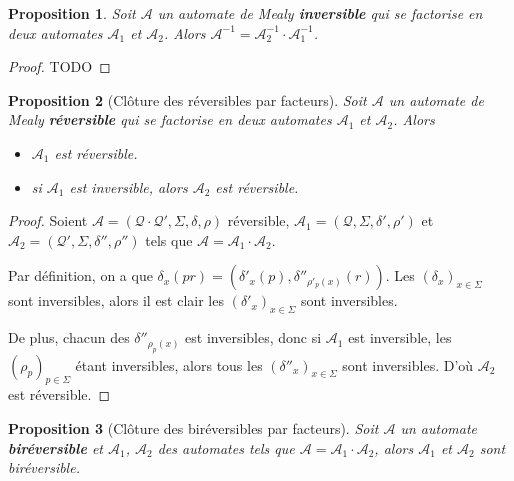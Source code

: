 \documentclass[11pt,a4paper]{article}
\newtheorem{prop}{Proposition}
\begin{document}
\begin{prop}\label{prop_inverse_produit}
    Soit $\mathcal{A}$ un automate de Mealy \textbf{inversible} qui se factorise en deux automates $\mathcal{A}_1$ et $\mathcal{A}_2$.
    Alors $\mathcal{A}^{-1} = \mathcal{A}_2^{-1} \cdot \mathcal{A}_1^{-1}$.
\end{prop}

\begin{proof}
  TODO
\end{proof}

\begin{prop}[Clôture des réversibles par facteurs]\label{prop_cloture_rev_facteurs}
  Soit $\mathcal{A}$ un automate de Mealy \textbf{réversible} qui se factorise en deux automates $\mathcal{A}_1$ et $\mathcal{A}_2$. Alors
  \begin{itemize}
  \item $\mathcal{A}_1$ est réversible.
  \item si $\mathcal{A}_1$ est inversible, alors $\mathcal{A}_2$ est réversible.
  \end{itemize}
\end{prop}

\begin{proof}
  Soient $\mathcal{A}=\left(\mathcal{Q\cdot Q'}, \Sigma, \delta, \rho\right)$ réversible, $\mathcal{A}_1=\left(\mathcal{Q}, \Sigma, \delta', \rho'\right)$ et $\mathcal{A}_2=\left(\mathcal{Q'}, \Sigma, \delta'', \rho''\right)$ tels que $\mathcal{A} = \mathcal{A}_1\cdot\mathcal{A}_2$.

  Par définition, on a que $\delta_x(pr) = (\delta'_x(p), \delta''_{\rho'_p(x)}(r))$. Les ${(\delta_x)}_{x\in\Sigma}$ sont inversibles, alors il est clair les ${(\delta'_x)}_{x\in\Sigma}$ sont inversibles.

  De plus, chacun des $\delta''_{\rho_p(x)}$ est inversibles, donc si $\mathcal{A}_1$ est inversible, les ${(\rho_p)}_{p\in\Sigma}$ étant inversibles, alors tous les ${(\delta''_x)}_{x\in\Sigma}$ sont inversibles. D'où $\mathcal{A}_2$ est réversible.
\end{proof}

\begin{prop}[Clôture des biréversibles par facteurs]
  Soit $\mathcal{A}$ un automate \textbf{biréversible} et $\mathcal{A}_1$, $\mathcal{A}_2$ des automates tels que $\mathcal{A}=\mathcal{A}_1\cdot\mathcal{A}_2$, alors $\mathcal{A}_1$ et $\mathcal{A}_2$ sont biréversible.
\end{prop}
\end{document}
